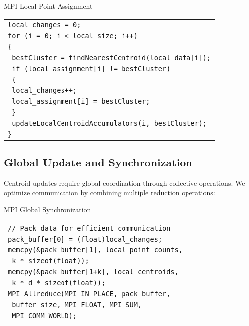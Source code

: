 \documentclass[10pt,a4paper,twocolumn]{article}
\makeatletter
\newcounter{alglineno}
\newenvironment{algtabular}{%
\setcounter{alglineno}{0}%
\begin{tabular}{@{\stepcounter{alglineno}\makebox[1.2em][r]{\tiny\thealglineno:}\hspace{0.2em}}l@{}}%
}{%
\end{tabular}%
}
\makeatother
\begin{document}
\begin{algorithm}[H]
\caption{MPI Local Point Assignment}
\label{alg:mpi_assignment}
\begin{algtabular}
\texttt{local\_changes = 0;} \\
\texttt{for (i = 0; i < local\_size; i++)} \\
\texttt{\{} \\
\texttt{  bestCluster = findNearestCentroid(local\_data[i]);} \\
\texttt{  if (local\_assignment[i] != bestCluster)} \\
\texttt{  \{} \\
\texttt{    local\_changes++;} \\
\texttt{    local\_assignment[i] = bestCluster;} \\
\texttt{  \}} \\
\texttt{  updateLocalCentroidAccumulators(i, bestCluster);} \\
\texttt{\}} \\
\end{algtabular}
\end{algorithm}

\subsection{Global Update and Synchronization}

Centroid updates require global coordination through collective operations. We optimize communication by combining multiple reduction operations:

\begin{algorithm}[H]
\caption{MPI Global Synchronization}
\label{alg:mpi_sync}
\begin{algtabular}
\texttt{// Pack data for efficient communication} \\
\texttt{pack\_buffer[0] = (float)local\_changes;} \\
\texttt{memcpy(\&pack\_buffer[1], local\_point\_counts,} \\
\texttt{       k * sizeof(float));} \\
\texttt{memcpy(\&pack\_buffer[1+k], local\_centroids,} \\
\texttt{       k * d * sizeof(float));} \\
\texttt{MPI\_Allreduce(MPI\_IN\_PLACE, pack\_buffer,} \\
\texttt{              buffer\_size, MPI\_FLOAT, MPI\_SUM,} \\
\texttt{              MPI\_COMM\_WORLD);} \\
\end{algtabular}
\end{algorithm}
\end{document}
